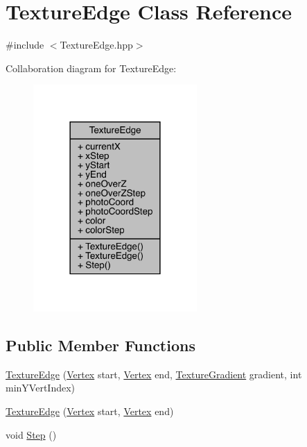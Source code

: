 \hypertarget{class_texture_edge}{}\section{Texture\+Edge Class Reference}
\label{class_texture_edge}


{\ttfamily \#include $<$Texture\+Edge.\+hpp$>$}



Collaboration diagram for Texture\+Edge\+:\nopagebreak
\begin{figure}[H]
\begin{center}
\leavevmode
\includegraphics[width=177pt]{class_texture_edge__coll__graph}
\end{center}
\end{figure}
\subsection*{Public Member Functions}
\begin{DoxyCompactItemize}
\item 
\hyperlink{class_texture_edge_adbdc3b619799de6ef2ca4a60b072a7f7}{Texture\+Edge} (\hyperlink{struct_vertex}{Vertex} start, \hyperlink{struct_vertex}{Vertex} end, \hyperlink{class_texture_gradient}{Texture\+Gradient} gradient, int min\+Y\+Vert\+Index)
\item 
\hyperlink{class_texture_edge_a15f585808723671c895a71792fe19c60}{Texture\+Edge} (\hyperlink{struct_vertex}{Vertex} start, \hyperlink{struct_vertex}{Vertex} end)
\item 
void \hyperlink{class_texture_edge_a65e70bfe49405d2bd92b32066fdc0752}{Step} ()
\end{DoxyCompactItemize}
